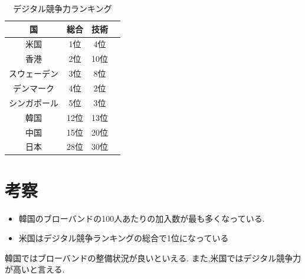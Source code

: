\documentclass[a4paper,11pt,dvipdfmx]{ujarticle}
\begin{document}
\begin{table}[htbp]
    \centering
    \caption{デジタル競争力ランキング}\label{tbl:ランキング}
    \begin{tabular}{|c|c|c|c|}
        \hline
        国 & 総合 & 技術 \\
        \hline
        米国 & 1位 & 4位 \\
        \hline
        香港 & 2位 & 10位 \\
        \hline
        スウェーデン & 3位 & 8位 \\
        \hline
        デンマーク & 4位 & 2位 \\
        \hline
        シンガポール & 5位 & 3位 \\
        \hline
        \hline
        韓国 & 12位 & 13位 \\
        \hline
        中国 & 15位 & 20位 \\
        \hline
        \hline
        日本 & 28位 & 30位 \\
        \hline
    \end{tabular}
\end{table}

\section{考察}

\begin{itemize}
    \item 韓国のブローバンドの100人あたりの加入数が最も多くなっている.
    \item 米国はデジタル競争ランキングの総合で1位になっている
\end{itemize}
韓国ではブローバンドの整備状況が良いといえる.
また,米国ではデジタル競争力が高いと言える.





%

%


\end{document}

